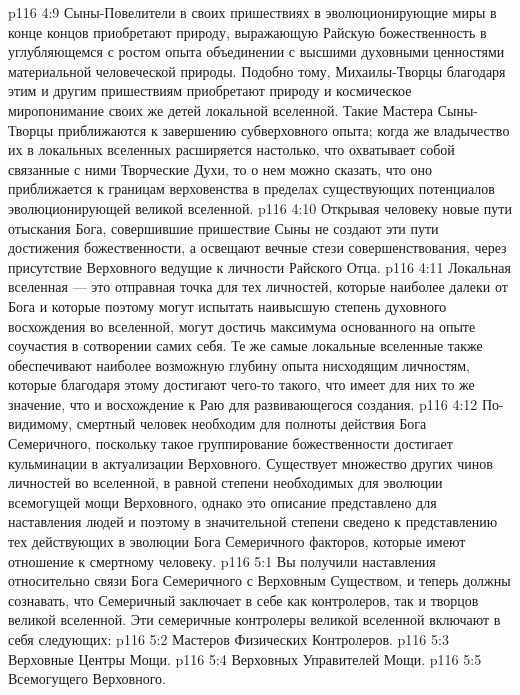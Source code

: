 \vs p116 4:9 Сыны\hyp{}Повелители в своих пришествиях в эволюционирующие миры в конце концов приобретают природу, выражающую Райскую божественность в углубляющемся с ростом опыта объединении с высшими духовными ценностями материальной человеческой природы. Подобно тому, Михаилы\hyp{}Творцы благодаря этим и другим пришествиям приобретают природу и космическое миропонимание своих же детей локальной вселенной. Такие Мастера Сыны\hyp{}Творцы приближаются к завершению субверховного опыта; когда же владычество их в локальных вселенных расширяется настолько, что охватывает собой связанные с ними Творческие Духи, то о нем можно сказать, что оно приближается к границам верховенства в пределах существующих потенциалов эволюционирующей великой вселенной.
\vs p116 4:10 Открывая человеку новые пути отыскания Бога, совершившие пришествие Сыны не создают эти пути достижения божественности, а освещают вечные стези совершенствования, через присутствие Верховного ведущие к личности Райского Отца.
\vs p116 4:11 Локальная вселенная --- это отправная точка для тех личностей, которые наиболее далеки от Бога и которые поэтому могут испытать наивысшую степень духовного восхождения во вселенной, могут достичь максимума основанного на опыте соучастия в сотворении самих себя. Те же самые локальные вселенные также обеспечивают наиболее возможную глубину опыта нисходящим личностям, которые благодаря этому достигают чего\hyp{}то такого, что имеет для них то же значение, что и восхождение к Раю для развивающегося создания.
\vs p116 4:12 \pc По\hyp{}видимому, смертный человек необходим для полноты действия Бога Семеричного, поскольку такое группирование божественности достигает кульминации в актуализации Верховного. Существует множество других чинов личностей во вселенной, в равной степени необходимых для эволюции всемогущей мощи Верховного, однако это описание представлено для наставления людей и поэтому в значительной степени сведено к представлению тех действующих в эволюции Бога Семеричного факторов, которые имеют отношение к смертному человеку.
\vs p116 5:1 Вы получили наставления относительно связи Бога Семеричного с Верховным Существом, и теперь должны сознавать, что Семеричный заключает в себе как контролеров, так и творцов великой вселенной. Эти семеричные контролеры великой вселенной включают в себя следующих:
\vs p116 5:2 \bibnobreakspace Мастеров Физических Контролеров.
\vs p116 5:3 \bibnobreakspace Верховные Центры Мощи.
\vs p116 5:4 \bibnobreakspace Верховных Управителей Мощи.
\vs p116 5:5 \bibnobreakspace Всемогущего Верховного.
